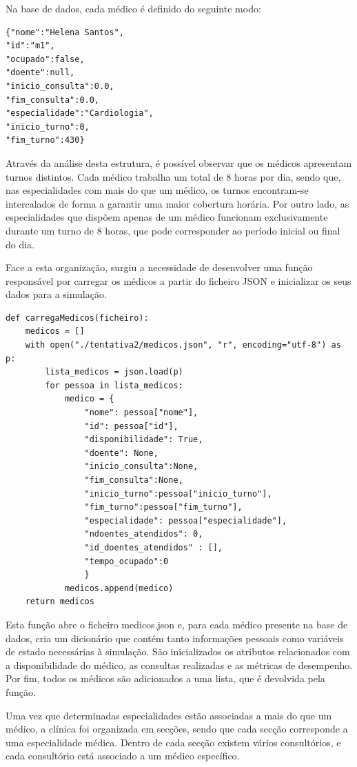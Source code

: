 \documentclass[12pt,a4paper]{article} %
\begin{document}
    Na base de dados, cada médico é definido do seguinte modo:

\begin{verbatim}
{"nome":"Helena Santos",
"id":"m1",
"ocupado":false,
"doente":null,
"inicio_consulta":0.0,
"fim_consulta":0.0,
"especialidade":"Cardiologia",
"inicio_turno":0,
"fim_turno":430}
\end{verbatim}

    Através da análise desta estrutura, é possível observar que os médicos apresentam turnos distintos. Cada médico trabalha um total de 8 horas por dia, sendo que, nas especialidades com mais do que um médico, os turnos encontram-se intercalados de forma a garantir uma maior cobertura horária. Por outro lado, as especialidades que dispõem apenas de um médico funcionam exclusivamente durante um turno de 8 horas, que pode corresponder ao período inicial ou final do dia.

    Face a esta organização, surgiu a necessidade de desenvolver uma função responsável por carregar os médicos a partir do ficheiro JSON e inicializar os seus dados para a simulação.

\begin{verbatim}
def carregaMedicos(ficheiro):
    medicos = []
    with open("./tentativa2/medicos.json", "r", encoding="utf-8") as p:
        lista_medicos = json.load(p)
        for pessoa in lista_medicos:
            medico = {
                "nome": pessoa["nome"],
                "id": pessoa["id"],
                "disponibilidade": True,
                "doente": None,
                "inicio_consulta":None,
                "fim_consulta":None,
                "inicio_turno":pessoa["inicio_turno"],
                "fim_turno":pessoa["fim_turno"],
                "especialidade": pessoa["especialidade"],
                "ndoentes_atendidos": 0,
                "id_doentes_atendidos" : [],
                "tempo_ocupado":0
                }
            medicos.append(medico)
    return medicos
\end{verbatim}

    Esta função abre o ficheiro medicos.json e, para cada médico presente na base de dados, cria um dicionário que contém tanto informações pessoais como variáveis de estado necessárias à simulação. São inicializados os atributos relacionados com a disponibilidade do médico, as consultas realizadas e as métricas de desempenho. Por fim, todos os médicos são adicionados a uma lista, que é devolvida pela função.

    Uma vez que determinadas especialidades estão associadas a mais do que um médico, a clínica foi organizada em secções, sendo que cada secção corresponde a uma especialidade médica. Dentro de cada secção existem vários consultórios, e cada consultório está associado a um médico específico.
\end{document}
